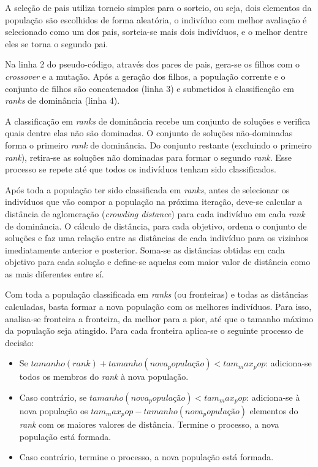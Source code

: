 A seleção de pais utiliza torneio simples para o sorteio, ou seja, dois elementos da população são escolhidos de forma aleatória, o indivíduo com melhor avaliação é selecionado como um dos pais, sorteia-se mais dois indivíduos, e o melhor dentre eles se torna o segundo pai.

Na linha 2 do pseudo-código, através dos pares de pais, gera-se os filhos com o \textit{crossover} e a mutação. Após a geração dos filhos, a população corrente e o conjunto de filhos são concatenados (linha 3) e submetidos à classificação em \textit{ranks} de dominância (linha 4).

A classificação em \textit{ranks} de dominância recebe um conjunto de soluções e verifica quais dentre elas não são dominadas. O conjunto de soluções não-dominadas forma o primeiro \textit{rank} de dominância. Do conjunto restante (excluindo o primeiro \textit{rank}), retira-se as soluções não dominadas para formar o segundo \textit{rank}. Esse processo se repete até que todos os indivíduos tenham sido classificados.

Após toda a população ter sido classificada em \textit{ranks}, antes de selecionar os indivíduos que vão compor a população na próxima iteração, deve-se calcular a distância de aglomeração (\textit{crowding distance}) para cada indivíduo em cada \textit{rank} de dominância. O cálculo de distância, para cada objetivo, ordena o conjunto de soluções e faz uma relação entre as distâncias de cada indivíduo para os vizinhos imediatamente anterior e posterior. Soma-se as distâncias obtidas em cada objetivo para cada solução e define-se aquelas com maior valor de distância como as mais diferentes entre sí.

Com toda a população classificada em \textit{ranks} (ou fronteiras) e todas as distâncias calculadas, basta formar a nova população com os melhores indivíduos. Para isso, analisa-se fronteira a fronteira, da melhor para a pior, até que o tamanho máximo da população seja atingido. Para cada fronteira aplica-se o seguinte processo de decisão:

\begin{itemize}  
	\item Se $tamanho(rank) + tamanho(nova_população) < tam_max_pop$: adiciona-se todos os membros do \textit{rank} à nova população.
	\item Caso contrário, se $tamanho(nova_população) < tam_max_pop$: adiciona-se à nova população os $tam_max_pop - tamanho(nova_população)$ elementos do \textit{rank} com os maiores valores de distância. Termine o processo, a nova população está formada.
	\item Caso contrário, termine o processo, a nova população está formada.
\end{itemize}

